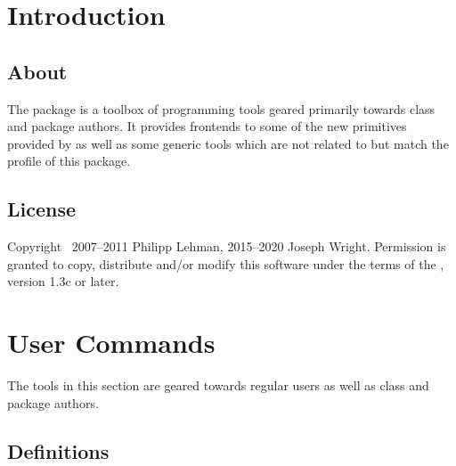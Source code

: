 \documentclass{ltxdockit}[2010/09/26]
\begin{document}
\printtitlepage
\tableofcontents

\section{Introduction}
\label{int}

\subsection[About]{About }

The  package is a toolbox of programming tools geared primarily towards \latex class and package authors. It provides \latex frontends to some of the new primitives provided by \etex as well as some generic tools which are not related to \etex but match the profile of this package.

\subsection{License}

Copyright \textcopyright\ 2007--2011 Philipp Lehman, 2015--2020 Joseph Wright. Permission is granted to copy, distribute and\slash or modify this software under the terms of the \lppl, version 1.3c or later.

\section{User Commands}
\label{use}

The tools in this section are geared towards regular users as well as class and package authors.

\subsection{Definitions}
\label{use:def}
\end{document}
